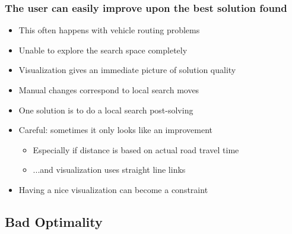 \documentclass[dvipsnames,aspectratio=169]{beamer}
\begin{document}
\begin{frame}
\frametitle{The user can easily improve upon the best solution found}
\begin{itemize}
\item This often happens with vehicle routing problems
\item Unable to explore the search space completely
\item Visualization gives an immediate picture of solution quality
  \item Manual changes correspond to local search moves
  \item One solution is to do a local search post-solving
  \item Careful: sometimes it only looks like an improvement
  \begin{itemize}
      \item Especially if distance is based on actual road travel time
      \item ...and visualization uses straight line links
  \end{itemize}
  \item Having a nice visualization can become a constraint
\end{itemize}
\end{frame}

\subsection*{Bad Optimality}
\end{document}
